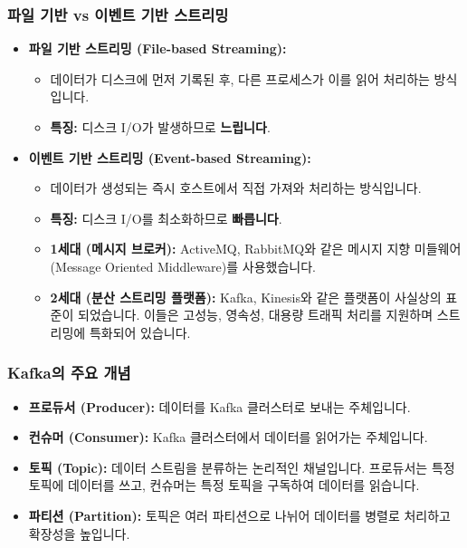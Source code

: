 \documentclass[11pt,a4paper]{article}
\theoremstyle{definition}
\begin{document}
\subsubsection{파일 기반 vs 이벤트 기반 스트리밍}
\begin{itemize}
    \item \textbf{파일 기반 스트리밍 (File-based Streaming):}
    \begin{itemize}
        \item 데이터가 디스크에 먼저 기록된 후, 다른 프로세스가 이를 읽어 처리하는 방식입니다.
        \item \textbf{특징:} 디스크 I/O가 발생하므로 \textbf{느립니다}.
    \end{itemize}
    \item \textbf{이벤트 기반 스트리밍 (Event-based Streaming):}
    \begin{itemize}
        \item 데이터가 생성되는 즉시 호스트에서 직접 가져와 처리하는 방식입니다.
        \item \textbf{특징:} 디스크 I/O를 최소화하므로 \textbf{빠릅니다}.
        \item \textbf{1세대 (메시지 브로커):} ActiveMQ, RabbitMQ와 같은 메시지 지향 미들웨어(Message Oriented Middleware)를 사용했습니다.
        \item \textbf{2세대 (분산 스트리밍 플랫폼):} Kafka, Kinesis와 같은 플랫폼이 사실상의 표준이 되었습니다. 이들은 고성능, 영속성, 대용량 트래픽 처리를 지원하며 스트리밍에 특화되어 있습니다.
    \end{itemize}
\end{itemize}

\subsubsection{Kafka의 주요 개념}
\begin{itemize}
    \item \textbf{프로듀서 (Producer):} 데이터를 Kafka 클러스터로 보내는 주체입니다.
    \item \textbf{컨슈머 (Consumer):} Kafka 클러스터에서 데이터를 읽어가는 주체입니다.
    \item \textbf{토픽 (Topic):} 데이터 스트림을 분류하는 논리적인 채널입니다. 프로듀서는 특정 토픽에 데이터를 쓰고, 컨슈머는 특정 토픽을 구독하여 데이터를 읽습니다.
    \item \textbf{파티션 (Partition):} 토픽은 여러 파티션으로 나뉘어 데이터를 병렬로 처리하고 확장성을 높입니다.
\end{itemize}
\end{document}
